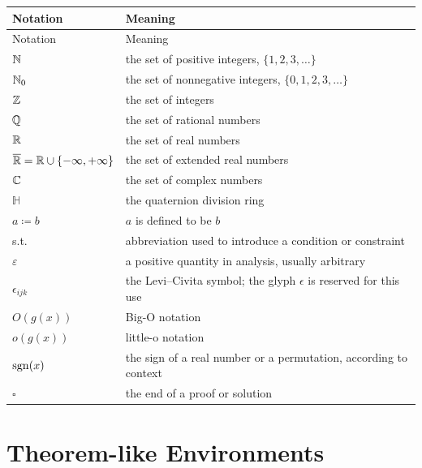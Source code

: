     {\small
    \renewcommand{\arraystretch}{1.18}
    \begin{longtable}{@{}L{0.24\textwidth}L{0.68\textwidth}@{}}
        \toprule
        Notation & Meaning \\
        \midrule
        \endfirsthead

        \toprule
        Notation & Meaning \\
        \midrule
        \endhead

        \bottomrule
        \endlastfoot

        $\mathbb{N}$ & the set of positive integers, $\{1,2,3,\dots\}$ \\
        $\mathbb{N}_0$ & the set of nonnegative integers, $\{0,1,2,3,\dots\}$ \\
        $\mathbb{Z}$ & the set of integers \\
        $\mathbb{Q}$ & the set of rational numbers \\
        $\mathbb{R}$ & the set of real numbers \\
        $\overline{\mathbb{R}}=\mathbb{R}\cup\{-\infty,+\infty\}$ & the set of extended real numbers \\
        $\mathbb{C}$ & the set of complex numbers \\
        $\mathbb{H}$ & the quaternion division ring \\
        $a\coloneqq b$ & $a$ is defined to be $b$ \\
        \textnormal{s.t.} & abbreviation used to introduce a condition or constraint \\
        $\varepsilon$ & a positive quantity in analysis, usually arbitrary \\
        $\epsilon_{ijk}$ & the Levi--Civita symbol; the glyph $\epsilon$ is reserved for this use \\
        $O(g(x))$ & Big-O notation \\
        $o(g(x))$ & little-o notation \\
        $\operatorname{sgn}(x)$ & the sign of a real number or a permutation, according to context \\
        $\square$ & the end of a proof or solution \\
    \end{longtable}
    }

    \section*{Theorem-like Environments}

